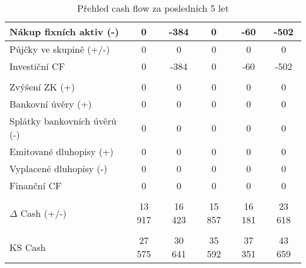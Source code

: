 \begin{table}[!hbtp]
\begin{tabular}{|l|ccccc|}
Nákup fixních aktiv (-) & \multicolumn{1}{c|}{0} & \multicolumn{1}{c|}{-384} & \multicolumn{1}{c|}{0} & \multicolumn{1}{c|}{-60} & -502 \\ \hline
Půjčky ve skupině (+/-) & \multicolumn{1}{c|}{0} & \multicolumn{1}{c|}{0} & \multicolumn{1}{c|}{0} & \multicolumn{1}{c|}{0} & 0 \\ \hline
Investiční CF & \multicolumn{1}{c|}{0} & \multicolumn{1}{c|}{-384} & \multicolumn{1}{c|}{0} & \multicolumn{1}{c|}{-60} & -502 \\ \hline
\rowcolor[HTML]{C0C0C0} 
 & \multicolumn{1}{c|}{\cellcolor[HTML]{C0C0C0}} & \multicolumn{1}{c|}{\cellcolor[HTML]{C0C0C0}} & \multicolumn{1}{c|}{\cellcolor[HTML]{C0C0C0}} & \multicolumn{1}{c|}{\cellcolor[HTML]{C0C0C0}} &  \\ \hline
Zvýšení ZK (+) & \multicolumn{1}{c|}{0} & \multicolumn{1}{c|}{0} & \multicolumn{1}{c|}{0} & \multicolumn{1}{c|}{0} & 0 \\ \hline
Bankovní úvěry (+) & \multicolumn{1}{c|}{0} & \multicolumn{1}{c|}{0} & \multicolumn{1}{c|}{0} & \multicolumn{1}{c|}{0} & 0 \\ \hline
Splátky bankovních úvěrů (-) & \multicolumn{1}{c|}{0} & \multicolumn{1}{c|}{0} & \multicolumn{1}{c|}{0} & \multicolumn{1}{c|}{0} & 0 \\ \hline
Emitované dluhopisy (+) & \multicolumn{1}{c|}{0} & \multicolumn{1}{c|}{0} & \multicolumn{1}{c|}{0} & \multicolumn{1}{c|}{0} & 0 \\ \hline
Vyplacené dluhopisy (-) & \multicolumn{1}{c|}{0} & \multicolumn{1}{c|}{0} & \multicolumn{1}{c|}{0} & \multicolumn{1}{c|}{0} & 0 \\ \hline
Finanční CF & \multicolumn{1}{c|}{0} & \multicolumn{1}{c|}{0} & \multicolumn{1}{c|}{0} & \multicolumn{1}{c|}{0} & 0 \\ \hline
\rowcolor[HTML]{C0C0C0} 
 & \multicolumn{1}{c|}{\cellcolor[HTML]{C0C0C0}} & \multicolumn{1}{c|}{\cellcolor[HTML]{C0C0C0}} & \multicolumn{1}{c|}{\cellcolor[HTML]{C0C0C0}} & \multicolumn{1}{c|}{\cellcolor[HTML]{C0C0C0}} &  \\ \hline
$\Delta$ Cash (+/-) & \multicolumn{1}{c|}{13 917} & \multicolumn{1}{c|}{16 423} & \multicolumn{1}{c|}{15 857} & \multicolumn{1}{c|}{16 181} & 23 618 \\ \hline
\rowcolor[HTML]{C0C0C0} 
 & \multicolumn{1}{c|}{\cellcolor[HTML]{C0C0C0}} & \multicolumn{1}{c|}{\cellcolor[HTML]{C0C0C0}} & \multicolumn{1}{c|}{\cellcolor[HTML]{C0C0C0}} & \multicolumn{1}{c|}{\cellcolor[HTML]{C0C0C0}} &  \\ \hline
KS Cash & \multicolumn{1}{c|}{27 575} & \multicolumn{1}{c|}{30 641} & \multicolumn{1}{c|}{35 592} & \multicolumn{1}{c|}{37 351} & 43 659 \\ \hline
\end{tabular}
\caption[Přehled cash flow za posledních 5 let]{Přehled cash flow za posledních 5 let}
\label{tab:Prehled cash flow}
\end{table}

